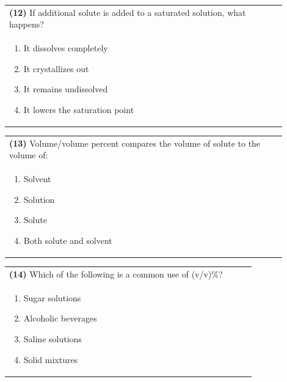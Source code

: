 \documentclass{article}
\begin{document}
\noindent\begin{tabular}{|p{0.9\linewidth}|}
\hline
\textbf{(12)} If additional solute is added to a saturated solution, what happens?\\[0.2cm]
\begin{minipage}[t]{0.85\linewidth}
\begin{enumerate}[label=\alph*.]
\item It dissolves completely
\item It crystallizes out
\item It remains undissolved
\item It lowers the saturation point
\end{enumerate}
\end{minipage}\\[0.2cm]
\hline
\end{tabular}
\newpage

\noindent\begin{tabular}{|p{0.9\linewidth}|}
\hline
\textbf{(13)} Volume/volume percent compares the volume of solute to the volume of:\\[0.2cm]
\begin{minipage}[t]{0.85\linewidth}
\begin{enumerate}[label=\alph*.]
\item Solvent
\item Solution
\item Solute
\item Both solute and solvent
\end{enumerate}
\end{minipage}\\[0.2cm]
\hline
\end{tabular}

\noindent\begin{tabular}{|p{0.9\linewidth}|}
\hline
\textbf{(14)} Which of the following is a common use of (v/v)\%?\\[0.2cm]
\begin{minipage}[t]{0.85\linewidth}
\begin{enumerate}[label=\alph*.]
\item Sugar solutions
\item Alcoholic beverages
\item Saline solutions
\item Solid mixtures
\end{enumerate}
\end{minipage}\\[0.2cm]
\hline
\end{tabular}
\end{document}
